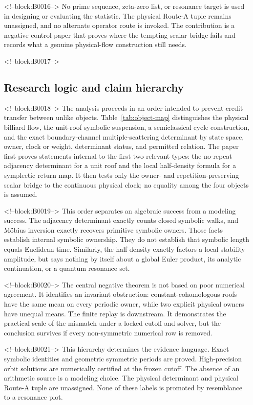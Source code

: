 \documentclass[11pt,a4paper]{article}
\theoremstyle{definition}
\theoremstyle{remark}
\begin{document}
<!--block:B0016-->
No prime sequence, zeta-zero list, or resonance target is used in designing or evaluating the statistic. The physical Route-A tuple remains unassigned, and no alternate operator route is invoked. The contribution is a negative-control paper that proves where the tempting scalar bridge fails and records what a genuine physical-flow construction still needs.

<!--block:B0017-->
\subsection{Research logic and claim hierarchy}

<!--block:B0018-->
The analysis proceeds in an order intended to prevent credit transfer between unlike objects. Table~\ref{tab:object-map} distinguishes the physical billiard flow, the unit-roof symbolic suspension, a semiclassical cycle construction, and the exact boundary-channel multiple-scattering determinant by state space, owner, clock or weight, determinant status, and permitted relation. The paper first proves statements internal to the first two relevant types: the no-repeat adjacency determinant for a unit roof and the local half-density formula for a symplectic return map. It then tests only the owner- and repetition-preserving scalar bridge to the continuous physical clock; no equality among the four objects is assumed.

<!--block:B0019-->
This order separates an algebraic success from a modeling success. The adjacency determinant exactly counts closed symbolic walks, and Möbius inversion exactly recovers primitive symbolic owners. Those facts establish internal symbolic ownership. They do not establish that symbolic length equals Euclidean time. Similarly, the half-density exactly factors a local stability amplitude, but says nothing by itself about a global Euler product, its analytic continuation, or a quantum resonance set.

<!--block:B0020-->
The central negative theorem is not based on poor numerical agreement. It identifies an invariant obstruction: constant-cohomologous roofs have the same mean on every periodic owner, while two explicit physical owners have unequal means. The finite replay is downstream. It demonstrates the practical scale of the mismatch under a locked cutoff and solver, but the conclusion survives if every non-symmetric numerical row is removed.

<!--block:B0021-->
This hierarchy determines the evidence language. Exact symbolic identities and geometric symmetric periods are proved. High-precision orbit solutions are numerically certified at the frozen cutoff. The absence of an arithmetic source is a modeling choice. The physical determinant and physical Route-A tuple are unassigned. None of these labels is promoted by resemblance to a resonance plot.
\end{document}
